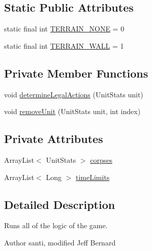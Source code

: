 \subsection*{Static Public Attributes}
\begin{DoxyCompactItemize}
\item 
static final int \hyperlink{classrts_1_1_physical_game_state_a786b873f5a5133fbccdf718e49b69b21}{TERRAIN\_\-NONE} = 0
\item 
static final int \hyperlink{classrts_1_1_physical_game_state_a9f7b7db835ac7abde2bd57718a9968f4}{TERRAIN\_\-WALL} = 1
\end{DoxyCompactItemize}
\subsection*{Private Member Functions}
\begin{DoxyCompactItemize}
\item 
void \hyperlink{classrts_1_1_physical_game_state_a5150e233dbe779274a3850e942a056a9}{determineLegalActions} (UnitStats unit)
\item 
void \hyperlink{classrts_1_1_physical_game_state_a2ba673d19082afa9c2ec199c308ae333}{removeUnit} (UnitStats unit, int index)
\end{DoxyCompactItemize}
\subsection*{Private Attributes}
\begin{DoxyCompactItemize}
\item 
ArrayList$<$ UnitStats $>$ \hyperlink{classrts_1_1_physical_game_state_ad414bf7c2032a2773bb429f8293ffde8}{corpses}
\item 
ArrayList$<$ Long $>$ \hyperlink{classrts_1_1_physical_game_state_af48781269d21723d6bced166ea38fe32}{timeLimits}
\end{DoxyCompactItemize}


\subsection{Detailed Description}
Runs all of the logic of the game. 

\begin{DoxyAuthor}{Author}
santi, modified Jeff Bernard 
\end{DoxyAuthor}


